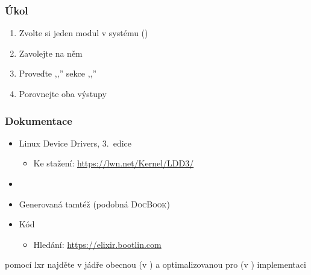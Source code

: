 \begin{frame}
  \frametitle{Úkol}

  \begin{enumerate}
  \item Zvolte si jeden modul v systému ()
  \item Zavolejte na něm 
  \item Proveďte ,,'' sekce ,,''
  \item Porovnejte oba výstupy
  \end{enumerate}
\end{frame}

\begin{frame}
  \frametitle{Dokumentace}

  \begin{itemize}
    \item Linux Device Drivers, 3.\ edice
    \begin{itemize}
      \item Ke stažení: \url{https://lwn.net/Kernel/LDD3/}
    \end{itemize}

    \item {}
    \item Generovaná tamtéž (podobná \textsc{DocBook})
    \item Kód
    \begin{itemize}
      \item Hledání: \url{https://elixir.bootlin.com}
    \end{itemize}
  \end{itemize}

  \medskip

   pomocí lxr najděte v jádře obecnou (v ) a
  optimalizovanou pro \xesl (v ) implementaci
\end{frame}

